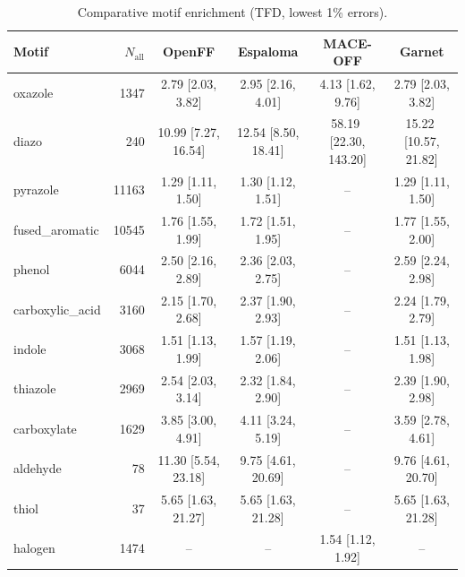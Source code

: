 \begin{table}[h!]
  \centering
  \small
  \setlength{\tabcolsep}{5pt}
  \renewcommand{\arraystretch}{1.15}
  \begin{tabular}{l r c c c c}
    \hline
    Motif & $N_\mathrm{all}$ & OpenFF & Espaloma & MACE-OFF & Garnet \\
    \hline
    oxazole & 1347 & 2.79\,\,[2.03, 3.82] & 2.95\,\,[2.16, 4.01] & 4.13\,\,[1.62, 9.76] & 2.79\,\,[2.03, 3.82] \\
    diazo & 240 & 10.99\,\,[7.27, 16.54] & 12.54\,\,[8.50, 18.41] & 58.19\,\,[22.30, 143.20] & 15.22\,\,[10.57, 21.82] \\
    \hdashline
    pyrazole & 11163 & 1.29\,\,[1.11, 1.50] & 1.30\,\,[1.12, 1.51] & -- & 1.29\,\,[1.11, 1.50] \\
    fused\_aromatic & 10545 & 1.76\,\,[1.55, 1.99] & 1.72\,\,[1.51, 1.95] & -- & 1.77\,\,[1.55, 2.00] \\
    phenol & 6044 & 2.50\,\,[2.16, 2.89] & 2.36\,\,[2.03, 2.75] & -- & 2.59\,\,[2.24, 2.98] \\
    carboxylic\_acid & 3160 & 2.15\,\,[1.70, 2.68] & 2.37\,\,[1.90, 2.93] & -- & 2.24\,\,[1.79, 2.79] \\
    indole & 3068 & 1.51\,\,[1.13, 1.99] & 1.57\,\,[1.19, 2.06] & -- & 1.51\,\,[1.13, 1.98] \\
    thiazole & 2969 & 2.54\,\,[2.03, 3.14] & 2.32\,\,[1.84, 2.90] & -- & 2.39\,\,[1.90, 2.98] \\
    carboxylate & 1629 & 3.85\,\,[3.00, 4.91] & 4.11\,\,[3.24, 5.19] & -- & 3.59\,\,[2.78, 4.61] \\
    aldehyde & 78 & 11.30\,\,[5.54, 23.18] & 9.75\,\,[4.61, 20.69] & -- & 9.76\,\,[4.61, 20.70] \\
    thiol & 37 & 5.65\,\,[1.63, 21.27] & 5.65\,\,[1.63, 21.28] & -- & 5.65\,\,[1.63, 21.28] \\
    \hdashline
    halogen & 1474 & -- & -- & 1.54\,\,[1.12, 1.92] & -- \\
    \hline
  \end{tabular}
  \caption{Comparative motif enrichment (TFD, lowest 1\% errors).}
  \label{tab:compare_tfd_best}
\end{table}